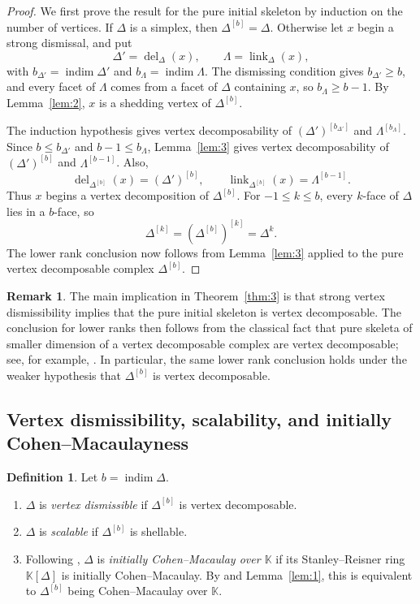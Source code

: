 \documentclass[11pt]{amsart}
\newcommand{\K}{\mathbb K}
\DeclareMathOperator{\indim}{indim}
\DeclareMathOperator{\link}{link}
\DeclareMathOperator{\del}{del}
\theoremstyle{definition}
\newtheorem{definition}[theorem]{Definition}
\newtheorem{remark}[theorem]{Remark}
\begin{document}
	\begin{proof}
		We first prove the result for the pure initial skeleton by induction on the number of vertices.  If $\Delta$ is a simplex, then $\Delta^{[b]}=\Delta$.  Otherwise let $x$ begin a strong dismissal, and put
		\[
		\Delta'=\del_\Delta(x),\qquad \Lambda=\link_\Delta(x),
		\]
		with $b_{\Delta'}=\indim\Delta'$ and $b_\Lambda=\indim\Lambda$.  The dismissing condition gives $b_{\Delta'}\geq b$, and every facet of $\Lambda$ comes from a facet of $\Delta$ containing $x$, so $b_\Lambda\geq b-1$.  By Lemma~\ref{lem:2}, $x$ is a shedding vertex of $\Delta^{[b]}$.
		
		The induction hypothesis gives vertex decomposability of $(\Delta')^{[b_{\Delta'}]}$ and $\Lambda^{[b_\Lambda]}$.  Since $b\leq b_{\Delta'}$ and $b-1\leq b_\Lambda$, Lemma~\ref{lem:3} gives vertex decomposability of $(\Delta')^{[b]}$ and $\Lambda^{[b-1]}$.  Also,
		\[
		\del_{\Delta^{[b]}}(x)=(\Delta')^{[b]},
		\qquad
		\link_{\Delta^{[b]}}(x)=\Lambda^{[b-1]}.
		\]
		Thus $x$ begins a vertex decomposition of $\Delta^{[b]}$. For $-1\leq k\leq b$, every $k$-face of $\Delta$ lies in a $b$-face, so
		\[
		\Delta^{[k]}=(\Delta^{[b]})^{[k]}=\Delta^k.
		\]
		The lower rank conclusion now follows from Lemma~\ref{lem:3} applied to the pure vertex decomposable complex $\Delta^{[b]}$.
	\end{proof}
	
	\begin{remark}\label{rem:2}
		The main implication in Theorem~\ref{thm:3} is that strong vertex dismissibility implies that the pure initial skeleton is vertex decomposable. The conclusion for lower ranks then follows from the classical fact that pure skeleta of smaller dimension of a vertex decomposable complex are vertex decomposable; see, for example, \cite[Lemma~3.10]{Woodroofe2011}.  In particular, the same lower rank conclusion holds under the weaker hypothesis that $\Delta^{[b]}$ is vertex decomposable.
	\end{remark}
	
	\subsection{Vertex dismissibility, scalability, and initially Cohen--Macaulayness}
	
	\begin{definition}\label{def:4}
		Let $b=\indim\Delta$.
		\begin{enumerate}[label=\textup{(\roman*)}]
			\item $\Delta$ is \emph{vertex dismissible} if $\Delta^{[b]}$ is vertex decomposable.
			\item $\Delta$ is \emph{scalable} if $\Delta^{[b]}$ is shellable.
			\item Following \cite{Namiq2026ICM}, $\Delta$ is \emph{initially Cohen--Macaulay over $\K$} if its Stanley--Reisner ring $\K[\Delta]$ is initially Cohen--Macaulay.  By \cite[Proposition~4.6]{Namiq2026ICM} and Lemma~\ref{lem:1}, this is equivalent to $\Delta^{[b]}$ being Cohen--Macaulay over $\K$.
		\end{enumerate}
	\end{definition}
	
\end{document}
